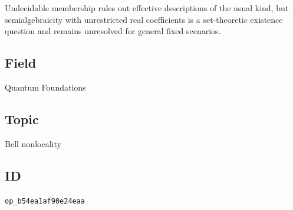 Undecidable membership rules out effective descriptions of the usual kind,
but semialgebraicity with unrestricted real coefficients is a set-theoretic
existence question and remains unresolved for general fixed scenarios.

\subsection*{Field}

Quantum Foundations

\subsection*{Topic}

Bell nonlocality

\subsection*{ID}

\texttt{op\_b54ea1af90e24eaa}
